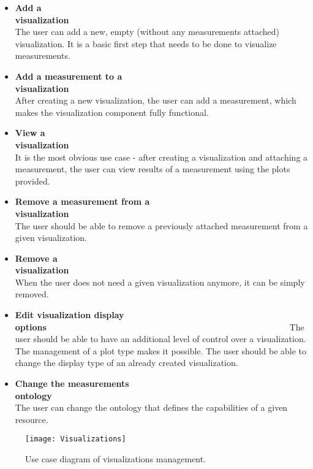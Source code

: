 \begin{itemize}

\item {\bf Add a visualization}~~~~~~~~~~~~~~~~~~~~~~~~~~~~~~~~~~~~~~~~~~~~~~~~~~~~~~~~\linebreak
The user can add a new, empty (without any measurements attached) visualization. It is a basic first step that needs to be done to visualize measurements.

\item {\bf Add a measurement to a visualization}~~~~~~~~~~~~~~~~~~~~~~~~~~~~~~~~~~~~~~~~~~~~~~~~~~~~~~~~\linebreak
After creating a new visualization, the user can add a measurement, which makes the visualization component fully functional.

\item {\bf View a visualization}~~~~~~~~~~~~~~~~~~~~~~~~~~~~~~~~~~~~~~~~~~~~~~~~~~~~~~~~\linebreak
It is the most obvious use case - after creating a visualization and attaching a measurement, the user can view results of a measurement using the plots provided.

\item {\bf Remove a measurement from a visualization}~~~~~~~~~~~~~~~~~~~~~~~~~~~~~~~~~~~~~~~~~~~~~~~~~~~~~~~~\linebreak
The user should be able to remove a previously attached measurement from a given visualization.

\item {\bf Remove a visualization}~~~~~~~~~~~~~~~~~~~~~~~~~~~~~~~~~~~~~~~~~~~~~~~~~~~~~~~~\linebreak
When the user does not need a given visualization anymore, it can be simply removed.

\item {\bf Edit  visualization display options}~~~~~~~~~~~~~~~~~~~~~~~~~~~~~~~~~~~~~~~~~~~~~~~~~~~~~~~~\linebreak
The user should be able to have an additional level of control over a visualization. The management of a plot type makes it possible. The user should be able to change the display type of an already created visualization.

\item {\bf Change the measurements ontology}~~~~~~~~~~~~~~~~~~~~~~~~~~~~~~~~~~~~~~~~~~~~~~~~~~~~~~~~\linebreak
The user can change the ontology that defines the capabilities of a given resource.

\end{itemize}

\begin{figure}[ht]
\centering
\texttt{[image: Visualizations]}
\caption{Use case diagram of visualizations management.}
\label{fig:usecases_visualisations}
\end{figure}
